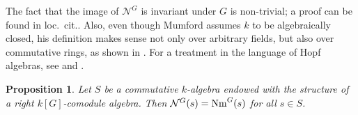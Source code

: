 \documentclass[12pt]{amsart}
\newtheorem{proposition}[theorem]{Proposition}
\theoremstyle{definition}
\begin{document}
 The fact that the image of ${\mathcal{N}}^G$ is invariant under $G$ is non-trivial; a proof can be found in loc.\ cit.. Also, even though Mumford assumes $k$ to be algebraically closed, his definition makes sense not only over arbitrary fields, but also over commutative rings, as shown in \cite[(4.18)-(4.21), pp. 56-57]{AbelianBook}. For a treatment in the language of Hopf algebras, see  \cite{MR1275919} and \cite[4.2.2]{MR1243637}.\\


\begin{proposition}\label{prop:Mumford}
	Let $S$ be a commutative $k$-algebra endowed with the structure of a right $k[G]$-comodule algebra. Then
	${\mathcal{N}}^G(s)={\rm Nm}^G(s)$ for all $s\in S$.
\end{proposition}
\end{document}
